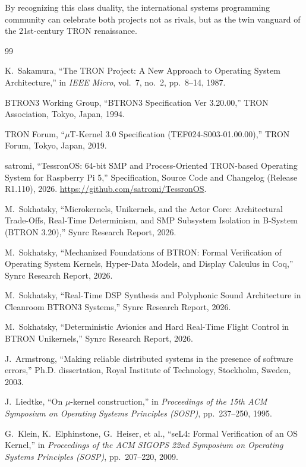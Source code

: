 \documentclass[10pt,journal,compsoc,twocolumn]{article}
\begin{document}
By recognizing this class duality, the international systems programming community can celebrate both projects not as rivals, but as the twin vanguard of the 21st-century TRON renaissance.

\begin{thebibliography}{99}

K.~Sakamura, ``The TRON Project: A New Approach to Operating System Architecture,'' in \emph{IEEE Micro}, vol.~7, no.~2, pp.~8--14, 1987.

BTRON3 Working Group, ``BTRON3 Specification Ver 3.20.00,'' TRON Association, Tokyo, Japan, 1994.

TRON Forum, ``$\mu$T-Kernel 3.0 Specification (TEF024-S003-01.00.00),'' TRON Forum, Tokyo, Japan, 2019.

satromi, ``TessronOS: 64-bit SMP and Process-Oriented TRON-based Operating System for Raspberry Pi 5,'' Specification, Source Code and Changelog (Release R1.110), 2026. \url{https://github.com/satromi/TessronOS}.

M.~Sokhatsky, ``Microkernels, Unikernels, and the Actor Core: Architectural Trade-Offs, Real-Time Determinism, and SMP Subsystem Isolation in B-System (BTRON 3.20),'' Synrc Research Report, 2026.

M.~Sokhatsky, ``Mechanized Foundations of BTRON: Formal Verification of Operating System Kernels, Hyper-Data Models, and Display Calculus in Coq,'' Synrc Research Report, 2026.

M.~Sokhatsky, ``Real-Time DSP Synthesis and Polyphonic Sound Architecture in Cleanroom BTRON3 Systems,'' Synrc Research Report, 2026.

M.~Sokhatsky, ``Deterministic Avionics and Hard Real-Time Flight Control in BTRON Unikernels,'' Synrc Research Report, 2026.

J.~Armstrong, ``Making reliable distributed systems in the presence of software errors,'' Ph.D. dissertation, Royal Institute of Technology, Stockholm, Sweden, 2003.

J.~Liedtke, ``On $\mu$-kernel construction,'' in \emph{Proceedings of the 15th ACM Symposium on Operating Systems Principles (SOSP)}, pp.~237--250, 1995.

G.~Klein, K.~Elphinstone, G.~Heiser, et al., ``seL4: Formal Verification of an OS Kernel,'' in \emph{Proceedings of the ACM SIGOPS 22nd Symposium on Operating Systems Principles (SOSP)}, pp.~207--220, 2009.

\end{thebibliography}
\end{document}
